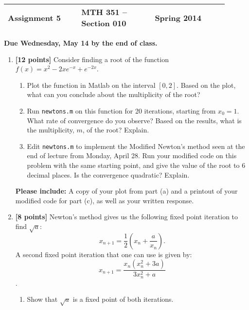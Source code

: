 \documentclass{article}
\newcommand{\myspace}{0.4cm}
\begin{document}
\begin{center}

\large
\begin{tabular}{L{0.3\linewidth} C{0.3\linewidth} R{0.3\linewidth}}
\hline
Assignment 5	&MTH 351 -- Section 010		&Spring 2014 \\
\hline
\end{tabular}

\vspace{\myspace}

{\bf Due Wednesday, May 14 by the end of class.}
\end{center}

\begin{enumerate}

\item {\bf [12 points]} Consider finding a root of the function $f(x) =x^2 - 2xe^{-x} + e^{-2x}$. 
\begin{enumerate} 
\item Plot the function in Matlab on the interval $[0,2]$. Based on the plot, what can you conclude about the multiplicity of the root?
\item Run {\tt newtons.m} on this function for 20 iterations, starting from $x_0=1$. What rate of convergence do you observe? Based on the results, what is the multiplicity, $m$, of the root? Explain.
\item Edit {\tt newtons.m} to implement the Modified Newton's method seen at the end of lecture from Monday, April 28. Run your modified code on this problem with the same starting point, and give the value of the root to 6 decimal places. Is the convergence quadratic? Explain.
\end{enumerate}

{\bf Please include:} A copy of your plot from part (a) and a printout of your modified code for part (c), as well as your written response.

\medskip

\item {\bf [8 points]} Newton's method gives us the following fixed point iteration to find $\sqrt{a}$:
\begin{equation*}
x_{n+1} = \frac{1}{2} \left( x_n + \frac{a}{x_n} \right).
\end{equation*}
A second fixed point iteration that one can use is given by:
\begin{equation*}
x_{n+1} = \frac{x_n (x_n^2 + 3a)}{3x_n^2 + a}
\end{equation*}.
\begin{enumerate}
\item Show that $\sqrt{a}$ is a fixed point of both iterations.


\end{enumerate}
\end{enumerate}
\end{document}
